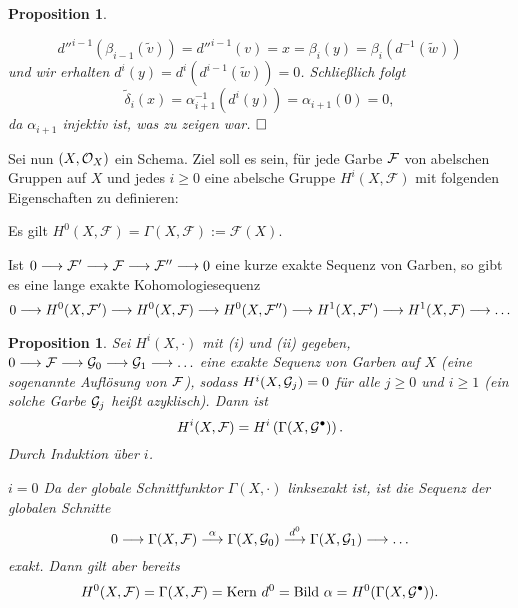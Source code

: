 \documentclass[11pt]{book}
\newtheorem{proposition}[theorem]{Proposition}
\theoremstyle{nonumberbreak}
\newenvironment{pr}[1][]{\ifthenelse{\equal{#1}{}}{\proof}{\proof[#1]}\rm}{\endproof}
\newcommand{\bild}{\mathrm{Bild}\ }
\newcommand{\kernel}{\mathrm{Kern}\ }
\begin{document}
\begin{spacing}{1.4}
\begin{proposition}
\begin{pr}
\begin{compactenum}
$$d''^{i-1}(\beta_{i-1}(\tilde{v})) = d''^{i-1}(v) = x = \beta_i(y) = \beta_i(d^{-1}(\tilde{w}))$$
und wir erhalten $d^{i}(y) = d^{i}(d^{i-1}(\tilde{w})) = 0$. Schließlich folgt 
$$\tilde{\delta}_i(x) = \alpha_{i+1}^{-1}(d^{i}(y)) = \alpha_{i+1}(0) = 0,$$
da $\alpha_{i+1}$ injektiv ist, was zu zeigen war. $\hfill \Box$
\end{compactenum}
\end{pr}


\end{proposition}

Sei nun $(X, \mathcal{O}_X)$ ein Schema. Ziel soll es sein, für jede Garbe $\mathcal{F}$ von abelschen Gruppen auf $X$ und jedes $i \geqslant 0$ eine abelsche Gruppe $H^{i}(X, \mathcal{F})$ mit folgenden Eigenschaften zu definieren:
\begin{compactenum}
\item Es gilt $H^{0}(X, \mathcal{F}) = \Gamma(X, \mathcal{F}) := \mathcal{F}(X)$.
\item Ist $0 \longrightarrow \mathcal{F}' \longrightarrow \mathcal{F} \longrightarrow \mathcal{F}'' \longrightarrow 0$ eine kurze exakte Sequenz von Garben, so gibt es eine lange exakte Kohomologiesequenz
$$0 \longrightarrow H^{0}(X, \mathcal{F}') \longrightarrow H^{0}(X, \mathcal{F}) \longrightarrow H^{0}(X, \mathcal{F}'') \longrightarrow H^{1}(X, \mathcal{F}') \longrightarrow H^{1}(X, \mathcal{F})\longrightarrow \ldots$$

\end{compactenum}


\begin{proposition}    %
Sei $H^{i}(X, \cdot)$ mit (i) und (ii) gegeben, $0 \longrightarrow \mathcal{F} \longrightarrow \mathcal{G}_0 \longrightarrow \mathcal{G}_1 \longrightarrow \ldots$ eine exakte Sequenz von Garben auf $X$ (eine sogenannte \textit{Auflösung} von $\mathcal{F}$), sodass $H^{i}(X, \mathcal{G}_j)=0$ für alle $j \geqslant 0$ und $i \geqslant 1$ (ein solche Garbe $\mathcal{G}_j$ heißt \textit{azyklisch}). Dann ist 
$$H^{i}(X, \mathcal{F}) = H^{i}\left(\Gamma(X, \mathcal{G}^{\bullet})\right).$$
\begin{pr}
Durch Induktion über $i$.
\begin{compactenum}
\item[$i = 0$] Da der globale Schnittfunktor $\Gamma(X, \cdot)$ linksexakt ist, ist die Sequenz der globalen Schnitte
$$0 \longrightarrow \Gamma(X, \mathcal{F}) \overset{\alpha}{\longrightarrow} \Gamma(X, \mathcal{G}_0) \overset{d^{0}}{\longrightarrow} \Gamma(X, \mathcal{G}_1) \longrightarrow \ldots$$
exakt. Dann gilt aber bereits
$$H^{0}(X, \F) = \Gamma(X, \F) = \kernel d^{0} = \bild \alpha = H^{0}(\Gamma(X, \G^{\bullet})).$$


\end{compactenum}
\end{pr}
\end{proposition}
\end{spacing}
\end{document}
